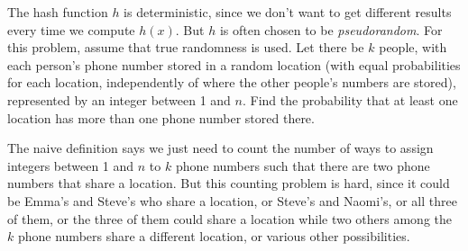 {    The hash function $h$ is deterministic, since we don't want to get different results every time we compute $h(x)$. 
    But $h$ is often chosen to be \textit{pseudorandom}. 
    For this problem, assume that true randomness is used. 
    Let there be $k$ people, with each person's phone number stored in a random location (with equal probabilities for each location, independently of where the other people's numbers are stored), represented by an integer between 1 and $n$. 
    Find the probability that at least one location has more than one phone number stored there. 
    \begin{solution}
        The naive definition says we just need to count the number of ways to assign integers between 1 and $n$ to $k$ phone numbers such that there are two phone numbers that share a location. 
        But this counting problem is hard, since it could be Emma's and Steve's who share a location, or Steve's and Naomi's, or all three of them, or the three of them could share a location while two others among the $k$ phone numbers share a different location, or various other possibilities. 


\end{solution}}
